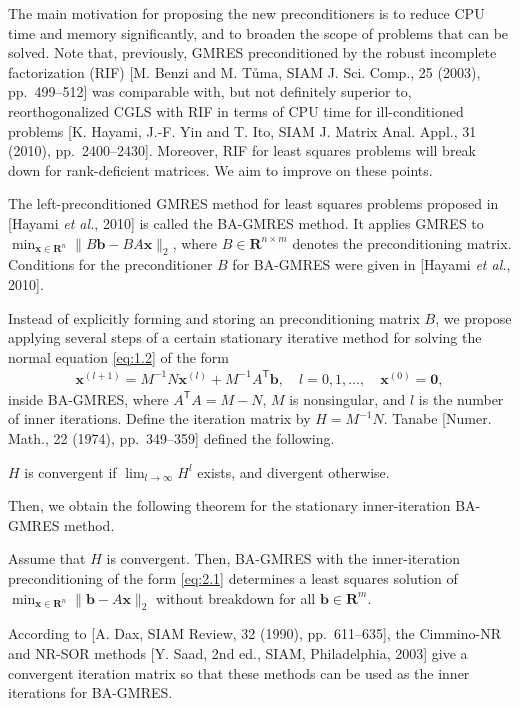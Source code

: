 \documentclass{report}
\begin{document}
The main motivation for proposing the new preconditioners is to reduce
CPU time and memory significantly, and to broaden the scope of problems
that can be solved.
Note that, previously, GMRES preconditioned by the robust incomplete
factorization (RIF) [M. Benzi and M. T{\r u}ma, SIAM J. Sci. Comp., 25
(2003), pp.~499--512] was comparable with, but not definitely superior
to, reorthogonalized CGLS with RIF in terms of CPU time for
ill-conditioned problems [K. Hayami, J.-F. Yin and T. Ito, SIAM J. Matrix
Anal. Appl., 31 (2010), pp.~2400--2430].
Moreover, RIF for least squares problems will break down for rank-deficient matrices.
We aim to improve on these points.

The left-pre\-con\-di\-tioned GMRES method for least squares problems
proposed in [Hayami \textit{et al.}, 2010] is called the BA-GMRES method.
It applies GMRES to $\displaystyle \min_{\boldsymbol{x} \in
\mathbf{R}^n}\| B \boldsymbol{b} - B A \boldsymbol{x} \|_2$, where $B \in
\mathbf{R}^{n \times m}$ denotes the preconditioning matrix.
Conditions for the preconditioner $B$ for BA-GMRES were given in [Hayami
\textit{et al.}, 2010].

Instead of explicitly forming and storing an preconditioning matrix $B$,
we propose applying several steps of a certain stationary iterative
method for solving the normal equation \eqref{eq:1.2} of the form
\begin{align}
\boldsymbol{x}^{(l+1)} = M^{-1} N \boldsymbol{x}^{(l)} + M^{-1}
A^\mathsf{T} \boldsymbol{b}, \quad l = 0, 1, \dots, \quad
\boldsymbol{x}^{(0)} = \boldsymbol{0},
\label{eq:2.1}
\end{align}
inside BA-GMRES, where $A^\mathsf{T} A = M - N$, $M$ is nonsingular, and
$l$ is the number of inner iterations.
Define the iteration matrix by $H = M^{-1} N$.
Tanabe [Numer. Math., 22 (1974), pp.~349--359] defined the following.
\begin{definition}
$H$ is convergent if $\displaystyle \lim_{l \rightarrow \infty} H^l$
exists, and divergent otherwise.
\end{definition}

Then, we obtain the following theorem for the stationary inner-iteration BA-GMRES method.
\begin{theorem} \label{th:2.6}
Assume that $H$ is convergent.
Then, BA-GMRES with the inner-iteration preconditioning of the form
\eqref{eq:2.1} determines a least squares solution of $\displaystyle
\min_{\boldsymbol{x} \in \mathbf{R}^{n}} \| \boldsymbol{b} - A
\boldsymbol{x} \|_2$ without breakdown for all $\boldsymbol{b} \in
\mathbf{R}^m$.
\end{theorem}
According to [A. Dax, SIAM Review, 32 (1990), pp.~611--635], the
Cimmino-NR and NR-SOR methods [Y. Saad, 2nd ed., SIAM, Philadelphia,
2003] give a convergent iteration matrix so that these methods can be
used as the inner iterations for BA-GMRES.
\end{document}
